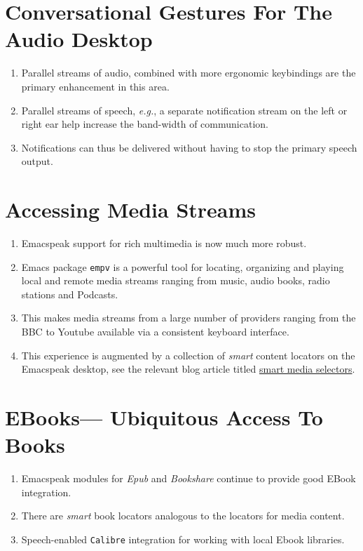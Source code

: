 \documentclass[11pt]{article}
\begin{document}
\section{Conversational Gestures For The Audio Desktop}
\label{sec:org98c1cf6}

\begin{enumerate}
\item Parallel streams of audio, combined with more ergonomic
keybindings are  the primary  enhancement in this area.
\item Parallel streams of speech, \emph{e.g.}, a separate notification
stream on the left or right ear  help increase the band-width of communication.
\item Notifications can thus be delivered without having to stop the
primary speech output.
\end{enumerate}
\section{Accessing Media Streams}
\label{sec:org870c255}


\begin{enumerate}
\item Emacspeak support for rich multimedia is now much  more robust.
\item Emacs package   \texttt{empv}  is a
powerful tool  for locating, organizing  and playing local and remote
media streams ranging from music, audio books, radio stations and
Podcasts.
\item This makes media streams from a large number of providers ranging
from the BBC to Youtube available via a consistent keyboard interface.
\item This experience is augmented by a collection of \emph{smart} content
locators on the Emacspeak desktop, see the relevant blog
article titled 
\href{https://emacspeak.blogspot.com/2024/03/updated-smart-media-selector-for-audio.html}{smart media selectors}.
\end{enumerate}
\section{EBooks—   Ubiquitous Access To Books}
\label{sec:orga698727}

\begin{enumerate}
\item Emacspeak modules  for \emph{Epub} and 
\emph{Bookshare} continue to provide good EBook integration.
\item There are  \emph{smart} book locators analogous to the locators for
media content.
\item Speech-enabled \texttt{Calibre} integration for working with  local
Ebook libraries.
\end{enumerate}
\end{document}
